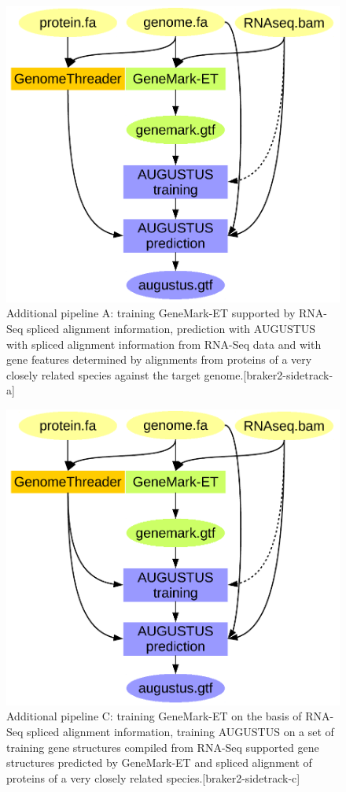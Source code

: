 \documentclass[]{article}
\begin{document}
\begin{itemize}
  \begin{figure}
  \centering
  \includegraphics{./figs/braker2.pdf}
  \caption{Additional pipeline A: training GeneMark-ET supported by
  RNA-Seq spliced alignment information, prediction with AUGUSTUS with
  spliced alignment information from RNA-Seq data and with gene features
  determined by alignments from proteins of a very closely related
  species against the target genome.{[}braker2-sidetrack-a{]}}
  \end{figure}

  \begin{figure}
  \centering
  \includegraphics{./figs/braker2_train_from_both.pdf}
  \caption{Additional pipeline C: training GeneMark-ET on the basis of
  RNA-Seq spliced alignment information, training AUGUSTUS on a set of
  training gene structures compiled from RNA-Seq supported gene
  structures predicted by GeneMark-ET and spliced alignment of proteins
  of a very closely related species.{[}braker2-sidetrack-c{]}}
  \end{figure}
\end{itemize}
\end{document}
